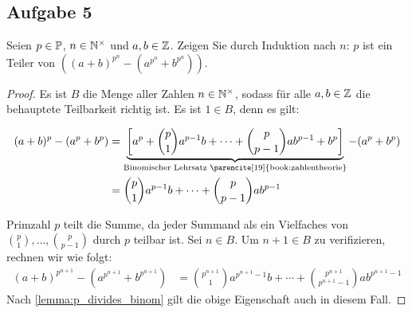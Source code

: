 \subsection{Aufgabe 5}
Seien $p \in \mathbb{P}$, $n \in \mathbb{N}^\times$ und $a,b \in \mathbb{Z}$. Zeigen Sie durch Induktion
nach $n$: $p$ ist ein Teiler von
$((a + b)^{p^n} - (a^{p^n} + b^{p^n}))$.
\begin{proof}
  Es ist $B$ die Menge aller Zahlen $n \in \mathbb{N}^\times$,
  sodass für alle $a,b \in \mathbb{Z}$ die behauptete Teilbarkeit richtig ist.
  Es ist $1 \in B$, denn es gilt:
  \begin{widemath}
    \begin{equation*}
      \begin{aligned}
        (a + b)^p - (a^p + b^p) & =
        \underbrace{\left[a^p + \binom{p}{1}a^{p-1}b + \dotsb +
        \binom{p}{p - 1}ab^{p-1} + b^p\right]}_{\text{Binomischer Lehrsatz \parencite[19]{book:zahlentheorie}}} - (a^p + b^p) \\
                                & = \binom{p}{1}a^{p-1}b + \dotsb + \binom{p}{p - 1}ab^{p-1}
      \end{aligned}
    \end{equation*}
  \end{widemath}
  Primzahl $p$ teilt die Summe, da jeder Summand als ein Vielfaches
  von $\binom{p}{1},\dotsc,\binom{p}{p - 1}$ durch $p$ teilbar ist.
  Sei $n \in B$. Um $n + 1 \in B$ zu verifizieren, rechnen wir wie folgt:
  \begin{equation*}
    \begin{aligned}
      (a + b)^{p^{n+1}} - (a^{p^{n+1}} + b^{p^{n+1}}) & =
      \binom{p^{n+1}}{1}a^{p^{n+1}-1}b + \dotsb + \binom{p^{n+1}}{p^{n+1} - 1}ab^{p^{n+1}-1}
    \end{aligned}
  \end{equation*}
  Nach \autoref{lemma:p_divides_binom} gilt die obige Eigenschaft auch in diesem Fall.
\end{proof}

